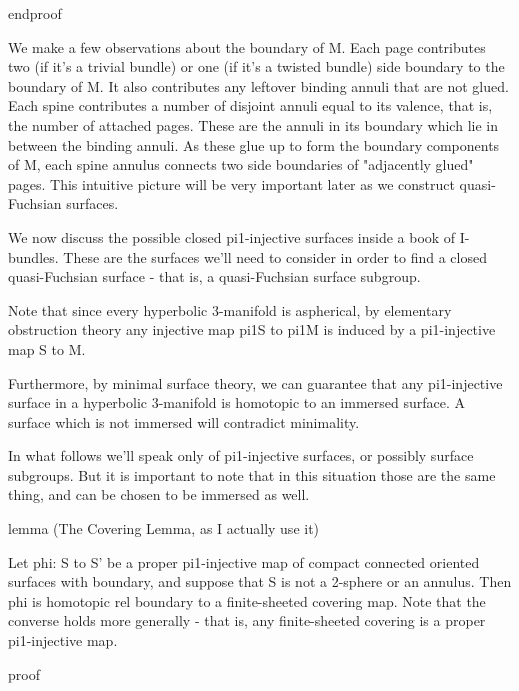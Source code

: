 endproof

We make a few observations about the boundary of M. Each page contributes two
(if it's a trivial bundle) or one (if it's a twisted bundle) side boundary to
the boundary of M. It also contributes any leftover binding annuli that are not
glued. Each spine contributes a number of disjoint annuli equal to its valence,
that is, the number of attached pages. These are the annuli in its boundary
which lie in between the binding annuli. As these glue up to form the boundary
components of M, each spine annulus connects two side boundaries of "adjacently
glued" pages. This intuitive picture will be very important later as we
construct quasi-Fuchsian surfaces.


We now discuss the possible closed pi1-injective surfaces inside a book of
I-bundles. These are the surfaces we'll need to consider in order to find
a closed quasi-Fuchsian surface - that is, a quasi-Fuchsian surface subgroup.

Note that since every hyperbolic 3-manifold is aspherical, by elementary
obstruction theory any injective map pi1S to pi1M is induced by a pi1-injective
map S to M.

Furthermore, by minimal surface theory, we can guarantee that any pi1-injective
surface in a hyperbolic 3-manifold is homotopic to an immersed surface.
A surface which is not immersed will contradict minimality.

In what follows we'll speak only of pi1-injective surfaces, or possibly surface
subgroups. But it is important to note that in this situation those are the
same thing, and can be chosen to be immersed as well.

lemma (The Covering Lemma, as I actually use it)

Let phi: S to S' be a proper pi1-injective map of compact connected oriented
surfaces with boundary, and suppose that S is not a 2-sphere or an annulus.
Then phi is homotopic rel boundary to a finite-sheeted covering map.  Note that
the converse holds more generally - that is, any finite-sheeted covering is
a proper pi1-injective map.

proof

